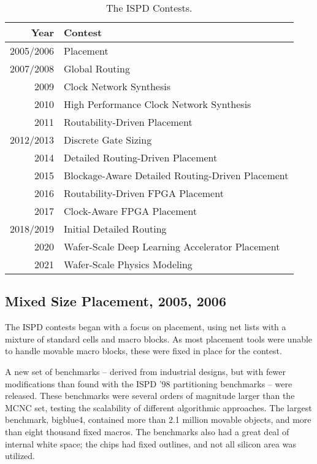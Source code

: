 \documentclass[sigconf]{acmart}
\begin{document}
\begin{table}
  \caption{The ISPD Contests.}
  \begin{tabular}{|r|l|}\hline
    Year & Contest \\ \hline
    2005/2006 & Placement \\ \hline
    2007/2008 & Global Routing \\ \hline
    2009 & Clock Network Synthesis \\ \hline    
    2010 & High Performance Clock Network Synthesis \\ \hline    
    2011 & Routability-Driven Placement \\ \hline
    2012/2013 & Discrete Gate Sizing \\ \hline
    2014 & Detailed Routing-Driven Placement \\ \hline    
    2015 & Blockage-Aware Detailed Routing-Driven Placement \\ \hline
    2016 & Routability-Driven FPGA Placement \\ \hline
    2017 & Clock-Aware FPGA Placement \\ \hline    
    2018/2019 & Initial Detailed Routing \\ \hline    
    2020 & Wafer-Scale Deep Learning Accelerator Placement \\ \hline
    2021 & Wafer-Scale Physics Modeling \\ \hline
  \end{tabular}
  \label{tab:ispdcontest}
\end{table}

\subsection{Mixed Size Placement, 2005, 2006}

The ISPD contests began with a focus on placement,
using net lists with a mixture of standard cells
and macro blocks\cite{ISPD05_contest}.  As most
placement tools were unable to handle movable
macro blocks, these were fixed in place for the
contest.

A new set of benchmarks -- derived from industrial
designs, but with fewer modifications than found
with the ISPD '98 partitioning benchmarks -- were released.
These benchmarks were several orders of magnitude
larger than the MCNC set, testing the scalability
of different algorithmic approaches.  The largest
benchmark, bigblue4, contained more than 2.1 million
movable objects, and more than eight thousand fixed
macros.  The benchmarks
also had a great deal of internal white space; the
chips had fixed outlines, and not all silicon area
was utilized.
\end{document}
